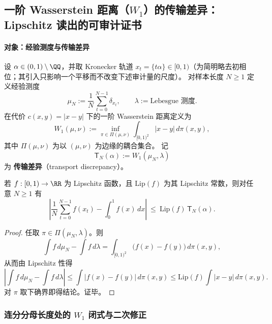 \subsection{一阶 Wasserstein 距离（\texorpdfstring{$W_1$}{W1}）的传输差异：Lipschitz 读出的可审计证书}\label{app:kronecker-w1-transport}

\paragraph{对象：经验测度与传输差异}
设 \(\alpha\in(0,1)\setminus\QQ\)，并取 Kronecker 轨道 \(x_t=\{t\alpha\}\in[0,1)\)（为简明略去初相位；其引入只影响一个平移而不改变下述审计量的尺度）。
对样本长度 \(N\ge 1\) 定义经验测度
\[
\mu_N:=\frac1N\sum_{t=0}^{N-1}\delta_{x_t},
\qquad
\lambda:=\text{Lebesgue 测度}.
\]
在代价 \(c(x,y)=|x-y|\) 下的一阶 Wasserstein 距离定义为
\[
W_1(\mu,\nu):=\inf_{\pi\in\Pi(\mu,\nu)}\int_{[0,1)^2}|x-y|\,d\pi(x,y),
\]
其中 \(\Pi(\mu,\nu)\) 为以 \((\mu,\nu)\) 为边缘的耦合集合。
记
\[
\mathsf{T}_N(\alpha):=W_1(\mu_N,\lambda)
\]
为 \textbf{传输差异}（transport discrepancy）。

\begin{theorem}\label{thm:kronecker-w1-lipschitz-readout}
若 \(f:[0,1)\to\RR\) 为 Lipschitz 函数，且 \(\mathrm{Lip}(f)\) 为其 Lipschitz 常数，则对任意 \(N\ge 1\) 有
\[
\left|\frac1N\sum_{t=0}^{N-1}f(x_t)-\int_0^1 f(x)\,dx\right|
\ \le\
\mathrm{Lip}(f)\,\mathsf{T}_N(\alpha).
\]
\end{theorem}
\begin{proof}
任取 \(\pi\in\Pi(\mu_N,\lambda)\)。则
\[
\int f\,d\mu_N-\int f\,d\lambda=\int_{[0,1)^2}\bigl(f(x)-f(y)\bigr)\,d\pi(x,y),
\]
从而由 Lipschitz 性得
\[
\left|\int f\,d\mu_N-\int f\,d\lambda\right|
\le
\int |f(x)-f(y)|\,d\pi(x,y)
\le
\mathrm{Lip}(f)\int |x-y|\,d\pi(x,y).
\]
对 \(\pi\) 取下确界即得结论。证毕。
\end{proof}

\subsubsection{连分分母长度处的 \texorpdfstring{$W_1$}{W1} 闭式与二次修正}\label{subsec:kronecker-w1-denominator}

